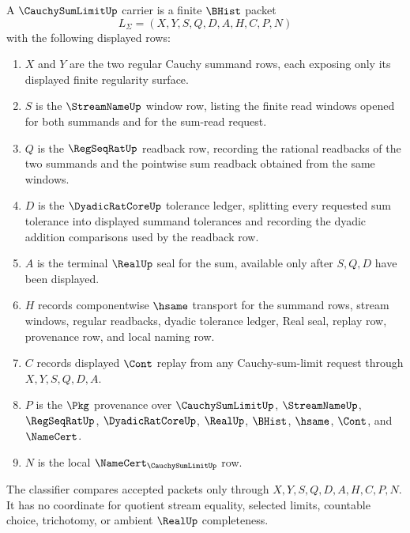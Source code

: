 \begin{definition}
\label{def:cauchy-sum-limit-carrier}
A $\CauchySumLimitUp$ carrier is a finite $\BHist$ packet
$$
L_{\Sigma}=(X,Y,S,Q,D,A,H,C,P,N)
$$
with the following displayed rows:
\begin{enumerate}
\item $X$ and $Y$ are the two regular Cauchy summand rows, each exposing only its displayed finite regularity surface.
\item $S$ is the $\StreamNameUp$ window row, listing the finite read windows opened for both summands and for the sum-read request.
\item $Q$ is the $\RegSeqRatUp$ readback row, recording the rational readbacks of the two summands and the pointwise sum readback obtained from the same windows.
\item $D$ is the $\DyadicRatCoreUp$ tolerance ledger, splitting every requested sum tolerance into displayed summand tolerances and recording the dyadic addition comparisons used by the readback row.
\item $A$ is the terminal $\RealUp$ seal for the sum, available only after $S,Q,D$ have been displayed.
\item $H$ records componentwise $\hsame$ transport for the summand rows, stream windows, regular readbacks, dyadic tolerance ledger, Real seal, replay row, provenance row, and local naming row.
\item $C$ records displayed $\Cont$ replay from any Cauchy-sum-limit request through $X,Y,S,Q,D,A$.
\item $P$ is the $\Pkg$ provenance over $\CauchySumLimitUp$, $\StreamNameUp$, $\RegSeqRatUp$, $\DyadicRatCoreUp$, $\RealUp$, $\BHist$, $\hsame$, $\Cont$, and $\NameCert$.
\item $N$ is the local $\NameCert_{\CauchySumLimitUp}$ row.
\end{enumerate}
The classifier compares accepted packets only through $X,Y,S,Q,D,A,H,C,P,N$. It has no coordinate for quotient stream equality, selected limits, countable choice, trichotomy, or ambient $\RealUp$ completeness.
\end{definition}


